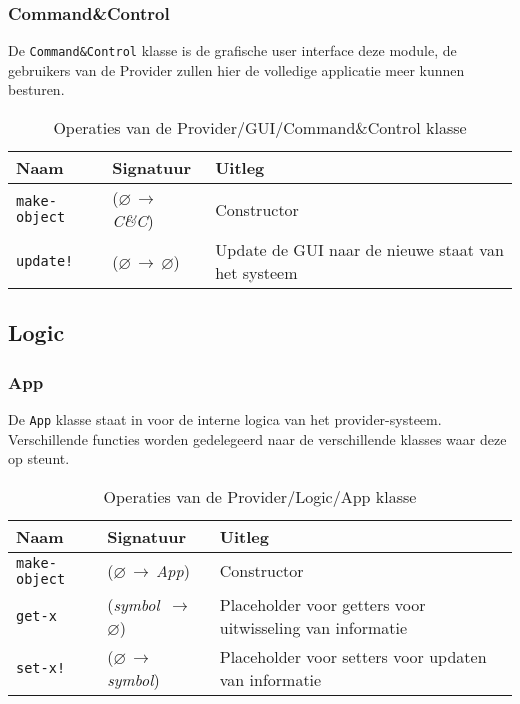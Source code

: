 \documentclass[a4paper, 11pt]{article}
\newcommand{\naar}{\,$\rightarrow$\,}
\renewcommand{\empty}{$\varnothing$}
\newcommand{\<}{\scriptsize\textless\normalsize}
\renewcommand{\>}{\scriptsize\textgreater\normalsize}
\begin{document}
\subsubsection{Command\&Control} %
De \texttt{Command\&Control} klasse is de grafische user interface deze module, de gebruikers van de Provider zullen hier de volledige applicatie meer kunnen besturen.
\begin{table}[H]
	\begin{center}
		{
			\begin{tabular}{|l l l|}
				\hline
				\textbf{Naam} & \textbf{Signatuur} & \textbf{Uitleg}\\
				\hline
				\texttt{make-object} & (\empty \naar \textit{C\&C}) & Constructor\\\hline
				\texttt{update!} & (\empty \naar \empty) & Update de GUI naar de nieuwe staat van het systeem\\
				\hline
		\end{tabular}}
		\caption{Operaties van de Provider/GUI/Command\&Control klasse}
	\end{center}
\end{table}

\newpage

\subsection{Logic} %

\subsubsection{App} %
De \texttt{App} klasse staat in voor de interne logica van het provider-systeem. Verschillende functies worden gedelegeerd naar de verschillende klasses waar deze op steunt.
\begin{table}[H]
	\begin{center}
		{
			\begin{tabular}{|l l l|}
				\hline
				\textbf{Naam} & \textbf{Signatuur} & \textbf{Uitleg}\\
				\hline
				\texttt{make-object} & (\empty \naar \textit{App}) & Constructor\\
				\hline
				\texttt{get-x} & (\textit{symbol} \naar \empty) & Placeholder voor getters voor uitwisseling van informatie\\
				\texttt{set-x!} & (\empty \naar \textit{symbol}) & Placeholder voor setters voor updaten van informatie\\
				\hline
		\end{tabular}}
		\caption{Operaties van de Provider/Logic/App klasse}
	\end{center}
\end{table}
\end{document}
